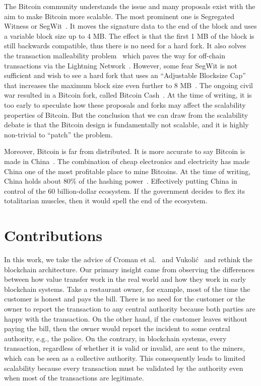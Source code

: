The Bitcoin community understands the issue and many proposals exist with the aim to make Bitcoin more scalable.
The most prominent one is Segregated Witness or SegWit~\cite{segwit}.
It moves the signature data to the end of the block and uses a variable block size up to 4 MB.
The effect is that the first 1 MB of the block is still backwards compatible, thus there is no need for a hard fork.
It also solves the transaction malleability problem~\cite{bitcoinmalleability} which paves the way for off-chain transactions via the Lightning Network~\cite{lightningnetwork}.
However, some fear SegWit is not sufficient and wish to see a hard fork that uses an ``Adjustable Blocksize Cap'' that increases the maximum block size even further to 8 MB~\cite{bitcoincash}.
The ongoing civil war resulted in a Bitcoin fork, called Bitcoin Cash~\cite{bitcoincasharticle}.
At the time of writing, it is too early to speculate how these proposals and forks may affect the scalability properties of Bitcoin.
But the conclusion that we can draw from the scalability debate is that the Bitcoin design is fundamentally not scalable,
and it is highly non-trivial to ``patch'' the problem.

Moreover, Bitcoin is far from distributed.
It is more accurate to say Bitcoin is made in China~\cite{madeinchina}.
The combination of cheap electronics and electricity has made China one of the most profitable place to mine Bitcoins.
At the time of writing, China holds about 80\% of the hashing power~\cite{bitcoinpool}.
Effectively putting China in control of the 60 billion-dollar ecosystem.
If the government decides to flex its totalitarian muscles,
then it would spell the end of the ecosystem.


\section{Contributions}
In this work, we take the advice of Croman et al.~\cite{croman2016scaling} and Vukoli\'{c}~\cite{vukolic2015quest} and rethink the blockchain architecture.
Our primary insight came from observing the differences between how value transfer work in the real world and how they work in early blockchain systems.
Take a restaurant owner, for example,
most of the time the customer is honest and pays the bill.
There is no need for the customer or the owner to report the transaction to any central authority 
because both parties are happy with the transaction.
On the other hand, if the customer leaves without paying the bill,
then the owner would report the incident to some central authority, e.g., the police.
On the contrary, in blockchain systems, every transaction, regardless of whether it is valid or invalid, are sent to the miners,
which can be seen as a collective authority.
This consequently leads to limited scalability because every transaction must be validated by the authority even when most of the transactions are legitimate.

